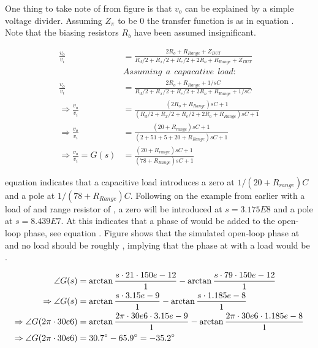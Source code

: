 One thing to take note of from figure  is that $v_o$ can be explained by a simple voltage divider. 
Assuming $Z_\pi$ to be 0 the transfer function is as in equation . Note that the biasing resistors $R_b$ have been assumed insignificant.

\begin{equation}
\label{eq_DAC_PWR_1}
\begin{split}
    \frac{v_o}{v_i} &= \frac{2R_o + R_{Range}+Z_{DUT}}{R_d/2+R_x/2+R_e/2+2R_o+R_{Range}+Z_{DUT}} \\
    &Assuming \:\: a \:\: capacative \:\: load: \\
    \frac{v_o}{v_i} &= \frac{2R_o + R_{Range}+1/sC}{R_d/2+R_x/2+R_e/2+2R_o+R_{Range}+1/sC} \\
    \Rightarrow \frac{v_o}{v_i} &= \frac{(2R_o + R_{Range})sC+1}{(R_d/2+R_x/2+R_e/2+2R_o+R_{Range})sC+1} \\
    \Rightarrow \frac{v_o}{v_i} &= \frac{(20+R_{range})sC+1}{(2+51+5+20+R_{Range})sC+1} \\
    \Rightarrow \frac{v_o}{v_i} = G(s) &= \frac{(20+R_{range})sC+1}{(78+R_{Range})sC+1}
\end{split}
\end{equation}

equation  indicates that a capacitive load introduces a zero at $1/(20+R_{range})C$ and a pole at $1/(78+R_{Range})C$. Following on the example from earlier with a load of  and range resistor of , a zero will be introduced at $s=3.175E8$ and a pole at $s=8.439E7$. At  this indicates that a phase of  would be added to the open-loop phase, see equation . Figure  shows that the simulated open-loop phase at  and no load should be roughly , implying that the phase at  with a  load would be .

\begin{equation}
\label{eq_DAC_PWR_2}
\begin{split}
    \angle G(s) &= \arctan{\frac{s\cdot21\cdot150e-12}{1}}-\arctan{\frac{s\cdot79\cdot150e-12}{1}} \\
    \Rightarrow \angle G(s) &= \arctan{\frac{s\cdot3.15e-9}{1}}-\arctan{\frac{s\cdot1.185e-8}{1}} \\
    \Rightarrow \angle G(2\pi \cdot30e6) &= \arctan{\frac{2\pi \cdot30e6\cdot3.15e-9}{1}}-\arctan{\frac{2\pi \cdot30e6\cdot1.185e-8}{1}} \\
    \Rightarrow \angle G(2\pi \cdot30e6) &= \SI{30.7}{\degree} - \SI{65.9}{\degree} = \SI{-35.2}{\degree} 
\end{split}
\end{equation}

